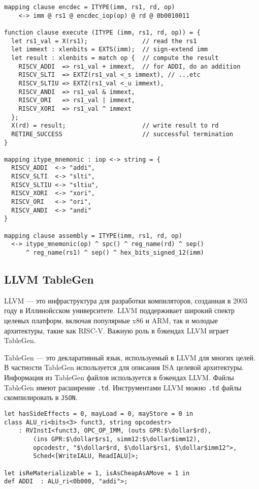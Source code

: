 \begin{lstlisting}[caption={Пример определения семантики исполнения инструкций addi, slti, sltiu, andi, ori, xori на Sail}, language={}, frame=single, label=itype]
mapping clause encdec = ITYPE(imm, rs1, rd, op)
    <-> imm @ rs1 @ encdec_iop(op) @ rd @ 0b0010011

function clause execute (ITYPE (imm, rs1, rd, op)) = {
  let rs1_val = X(rs1);               // read the rs1
  let immext : xlenbits = EXTS(imm);  // sign-extend imm
  let result : xlenbits = match op {  // compute the result
    RISCV_ADDI  => rs1_val + immext,  // for ADDI, do an addition
    RISCV_SLTI  => EXTZ(rs1_val <_s immext), // ...etc
    RISCV_SLTIU => EXTZ(rs1_val <_u immext),
    RISCV_ANDI  => rs1_val & immext,
    RISCV_ORI   => rs1_val | immext,
    RISCV_XORI  => rs1_val ^ immext
  };
  X(rd) = result;                     // write result to rd
  RETIRE_SUCCESS                      // successful termination
}

mapping itype_mnemonic : iop <-> string = {
  RISCV_ADDI  <-> "addi",
  RISCV_SLTI  <-> "slti",
  RISCV_SLTIU <-> "sltiu",
  RISCV_XORI  <-> "xori",
  RISCV_ORI   <-> "ori",
  RISCV_ANDI  <-> "andi"
}

mapping clause assembly = ITYPE(imm, rs1, rd, op)
  <-> itype_mnemonic(op) ^ spc() ^ reg_name(rd) ^ sep()
      ^ reg_name(rs1) ^ sep() ^ hex_bits_signed_12(imm)

\end{lstlisting}

\subsection{LLVM TableGen}

LLVM --- это инфраструктура для разработки компиляторов, созданная в 2003 году в Иллинойсском университете. LLVM поддерживает широкий спектр целевых платформ, включая популярные x86 и ARM, так и молодые архитектуры, такие как RISC-V. Важную роль в бэкендах LLVM играет TableGen.

TableGen --- это декларативный язык, используемый в LLVM для многих целей. В частности TableGen используется для описания ISA целевой архитектуры. Информация из TableGen файлов используется в бэкендах LLVM. Файлы TableGen имеют расширение \texttt{.td}. Инструментами LLVM можно \texttt{.td} файлы скомпилировать в \texttt{JSON}.

\begin{lstlisting}[caption={Описание инструкции addi при помощи TableGen}, language={}, frame=single, mathescape = true]
let hasSideEffects = 0, mayLoad = 0, mayStore = 0 in
class ALU_ri<bits<3> funct3, string opcodestr>
    : RVInstI<funct3, OPC_OP_IMM, (outs GPR:$\dollar$rd),
        (ins GPR:$\dollar$rs1, simm12:$\dollar$imm12),
        opcodestr, "$\dollar$rd, $\dollar$rs1, $\dollar$imm12">,
        Sched<[WriteIALU, ReadIALU]>;

let isReMaterializable = 1, isAsCheapAsAMove = 1 in
def ADDI  : ALU_ri<0b000, "addi">;
\end{lstlisting}

